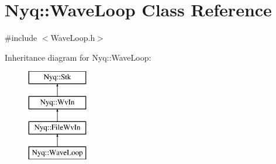 \hypertarget{class_nyq_1_1_wave_loop}{}\section{Nyq\+:\+:Wave\+Loop Class Reference}
\label{class_nyq_1_1_wave_loop}


{\ttfamily \#include $<$Wave\+Loop.\+h$>$}

Inheritance diagram for Nyq\+:\+:Wave\+Loop\+:\begin{figure}[H]
\begin{center}
\leavevmode
\includegraphics[height=4.000000cm]{class_nyq_1_1_wave_loop}
\end{center}
\end{figure}
